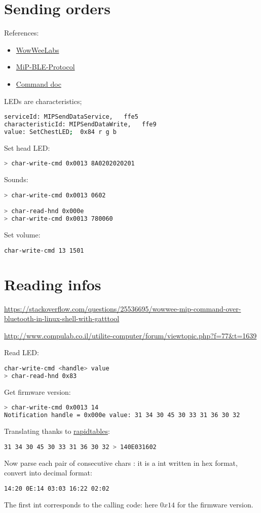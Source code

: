 \documentclass[a4paper,10pt]{article}
\newcommand{\link}[1] {\href{#1}{#1}}
\begin{document}
\section{Sending orders}
References:\begin{itemize}
 \item \href{https://github.com/WowWeeLabs}{WowWeeLabs}
 \item \href{https://github.com/WowWeeLabs/MiP-BLE-Protocol}{MiP-BLE-Protocol}
 \item \href{https://github.com/WowWeeLabs/MiP-BLE-Protocol/blob/master/MiP-Protocol.md}
     {Command doc}
\end{itemize}


LEDs are characteristics;
\begin{lstlisting}[language=bash]
serviceId: MIPSendDataService,   ffe5
characteristicId: MIPSendDataWrite,   ffe9
value: SetChestLED;  0x84 r g b
\end{lstlisting}

Set head LED:
\begin{lstlisting}[language=bash]
> char-write-cmd 0x0013 8A0202020201
\end{lstlisting}

Sounds:
\begin{lstlisting}[language=bash]
> char-write-cmd 0x0013 0602

> char-read-hnd 0x000e
> char-write-cmd 0x0013 780060
\end{lstlisting}

Set volume:
\begin{lstlisting}[language=bash]
char-write-cmd 13 1501
\end{lstlisting}


\section{Reading infos}
\link{https://stackoverflow.com/questions/25536695/wowwee-mip-command-over-bluetooth-in-linux-shell-with-gatttool}

\link{http://www.compulab.co.il/utilite-computer/forum/viewtopic.php?f=77\&t=1639}

Read LED:
\begin{lstlisting}[language=bash]
char-write-cmd <handle> value
> char-read-hnd 0x83
\end{lstlisting}

Get firmware version:
\begin{lstlisting}[language=bash]
> char-write-cmd 0x0013 14
Notification handle = 0x000e value: 31 34 30 45 30 33 31 36 30 32
\end{lstlisting}
Translating thanks to 
\href{http://www.rapidtables.com/convert/number/hex-to-ascii.htm}{rapidtables}:
\begin{lstlisting}[language=bash]
31 34 30 45 30 33 31 36 30 32 > 140E031602
\end{lstlisting}
Now parse each pair of consecutive chars : 
it is a int written in hex format, convert into decimal format:
\begin{lstlisting}[language=bash]
14:20 0E:14 03:03 16:22 02:02
\end{lstlisting}
The first int corresponds to the calling code: here $0x14$ for the firmware version.
\end{document}
